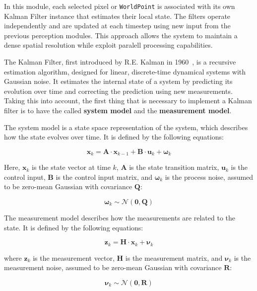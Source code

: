 In this module, each selected pixel or \texttt{WorldPoint} is associated with its own Kalman Filter
instance that estimates their local state. The filters operate independently and are updated
at each timestep using new input from the previous perception modules. This approach allows the system 
to maintain a dense spatial resolution while exploit paralell processing capabilities. 

The Kalman Filter, first introduced by R.E. Kalman in 1960~\cite{kalman}, is a recursive 
estimation algorithm, designed for linear, discrete-time dynamical systems with Gaussian noise. 
It estimates the internal state of a system by predicting its evolution over time and correcting
the prediction using new measurements. Taking this into account, the first thing that is necessary 
to implement a Kalman filter is to have the called \textbf{system model} and the \textbf{measurement model}. 

The system model is a state space representation of the system, which describes how the state evolves
over time. It is defined by the following equations:

\begin{equation}
  \mathbf{x}_k = \mathbf{A} \cdot \mathbf{x}_{k-1} + \mathbf{B} \cdot \mathbf{u}_k + \boldsymbol{\omega}_k
\end{equation}

Here, $\mathbf{x}_k$ is the state vector at time $k$, $\mathbf{A}$ is the state transition matrix, 
$\mathbf{u}_k$ is the control input, $\mathbf{B}$ is the control input matrix, and $\boldsymbol{\omega}_k$ 
is the process noise, assumed to be zero-mean Gaussian with covariance $\mathbf{Q}$:

\begin{equation}
  \boldsymbol{\omega}_k \sim \mathcal{N}(\mathbf{0}, \mathbf{Q})
\end{equation}

The measurement model describes how the measurements are related to the state. It is defined by the
following equations:

\begin{equation}
  \mathbf{z}_k = \mathbf{H} \cdot \mathbf{x}_k + \boldsymbol{\nu}_k
\end{equation}

where $\mathbf{z}_k$ is the measurement vector, $\mathbf{H}$ is the measurement matrix, and 
$\boldsymbol{\nu}_k$ is the measurement noise, assumed to be zero-mean Gaussian with covariance 
$\mathbf{R}$:

\begin{equation}
  \boldsymbol{\nu}_k \sim \mathcal{N}(\mathbf{0}, \mathbf{R})
\end{equation}

